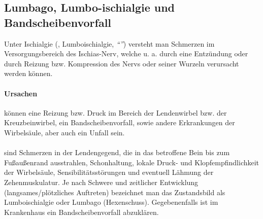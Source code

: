 


\subsection{Lumbago, Lumbo-ischialgie und Bandscheibenvorfall} 
\label{topic:lumbago}

Unter Ischialgie (, Lumboischialgie,
\emph{"`"'}) versteht man Schmerzen im
Versorgungsbereich des Ischias-Nerv, welche u. a. durch eine Entzündung oder durch Reizung bzw. Kompression des Nervs oder seiner
Wurzeln verursacht werden können. 

\paragraph{Ursachen} können eine Reizung bzw. Druck
im Bereich der Lendenwirbel bzw. der Kreuzbeinwirbel,
ein Bandscheibenvorfall, sowie andere Erkrankungen der Wirbelsäule, aber auch ein Unfall sein. 

\paragraph{\TxSymptome} sind Schmerzen in der
Lendengegend, die in das betroffene Bein bis zum Fußaußenrand ausstrahlen, 
Schonhaltung, lokale Druck- und Klopfempfindlichkeit der Wirbelsäule,
Sensibilitätsstörungen und eventuell Lähmung der Zehenmuskulatur. Je nach
Schwere und zeitlicher Entwicklung (langsames/plötzliches Auftreten) bezeichnet
man das Zustandsbild als Lumboischialgie oder Lumbago (Hexenschuss). 
Gegebenenfalls ist im Krankenhaus ein Bandscheibenvorfall abzuklären.




